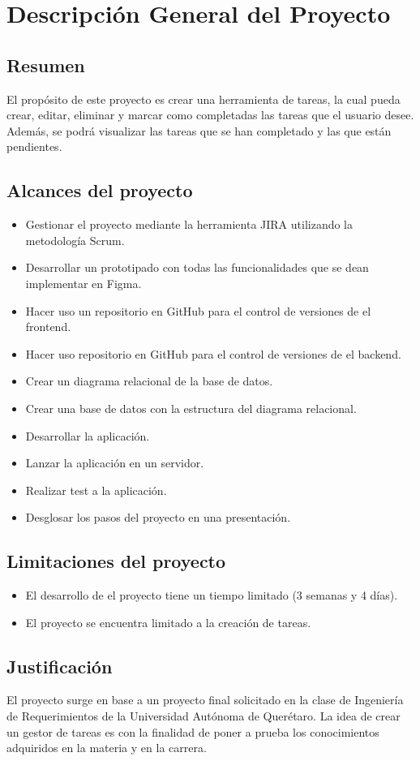 \chapter{Descripción General del Proyecto}
\section{Resumen}
El propósito de este proyecto es crear una herramienta de tareas, la cual pueda crear, editar, eliminar y marcar como completadas
las tareas que el usuario desee. Además, se podrá visualizar las tareas que se han completado y las que están pendientes.

\section{Alcances del proyecto}
\begin{itemize}
  \item Gestionar el proyecto mediante la herramienta JIRA utilizando la metodología Scrum.
  \item Desarrollar un prototipado con todas las funcionalidades que se dean implementar en Figma.
  \item Hacer uso un repositorio en GitHub para el control de versiones de el frontend.
  \item Hacer uso repositorio en GitHub para el control de versiones de el backend.
  \item Crear un diagrama relacional de la base de datos.
  \item Crear una base de datos con la estructura del diagrama relacional.
  \item Desarrollar la aplicación.
  \item Lanzar la aplicación en un servidor.
  \item Realizar test a la aplicación.
  \item Desglosar los pasos del proyecto en una presentación.
\end{itemize}

\section{Limitaciones del proyecto}
\begin{itemize}
  \item El desarrollo de el proyecto tiene un tiempo limitado (3 semanas y 4 días).
  \item El proyecto se encuentra limitado a la creación de tareas.
\end{itemize}


\section{Justificación}
El proyecto surge en base a un proyecto final solicitado en la clase de Ingeniería de Requerimientos
de la Universidad Autónoma de Querétaro. La idea de crear un gestor de tareas es con la finalidad de poner 
a prueba los conocimientos adquiridos en la materia y en la carrera.
